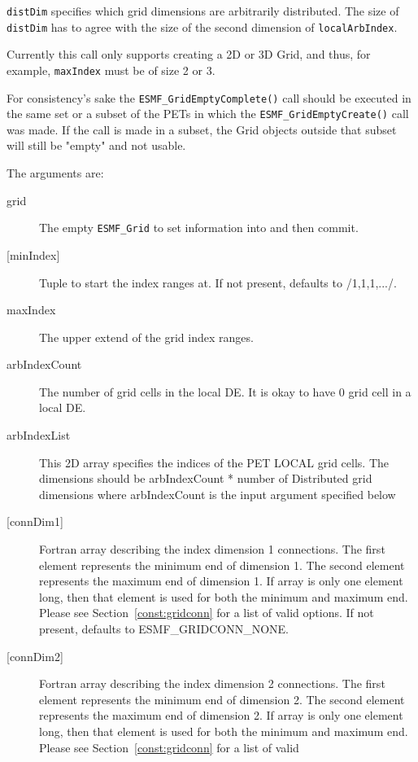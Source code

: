    {\tt distDim} specifies which grid dimensions are arbitrarily distributed. The
   size of {\tt distDim} has to agree with the size of the second dimension of
   {\tt localArbIndex}.
  
   Currently this call
   only supports creating a 2D or 3D Grid, and thus, for example, {\tt maxIndex} must be of size 2 or 3.
  
   For consistency's sake the {\tt ESMF\_GridEmptyComplete()} call
   should be executed in the same set or a subset of the PETs in which the
   {\tt ESMF\_GridEmptyCreate()} call was made. If the call
   is made in a subset, the Grid objects outside that subset will
   still be "empty" and not usable.
  
   The arguments are:
   \begin{description}
   \item[grid]
       The empty {\tt ESMF\_Grid} to set information into and then commit.
   \item[{[minIndex]}]
        Tuple to start the index ranges at. If not present, defaults
        to /1,1,1,.../.
   \item[maxIndex]
        The upper extend of the grid index ranges.
   \item[arbIndexCount]
        The number of grid cells in the local DE. It is okay to have 0
        grid cell in a local DE.
   \item[arbIndexList]
        This 2D array specifies the indices of the PET LOCAL grid cells.  The
        dimensions should be arbIndexCount * number of Distributed grid dimensions
        where arbIndexCount is the input argument specified below
   \item[{[connDim1]}]
        Fortran array describing the index dimension 1 connections.
        The first element represents the minimum end of dimension 1.
        The second element represents the maximum end of dimension 1.
        If array is only one element long, then that element is used
        for both the minimum and maximum end.
        Please see Section~\ref{const:gridconn} for a list of valid
        options. If not present, defaults to ESMF\_GRIDCONN\_NONE.
   \item[{[connDim2]}]
        Fortran array describing the index dimension 2 connections.
        The first element represents the minimum end of dimension 2.
        The second element represents the maximum end of dimension 2.
        If array is only one element long, then that element is used
        for both the minimum and maximum end.
        Please see Section~\ref{const:gridconn} for a list of valid

\end{description}

